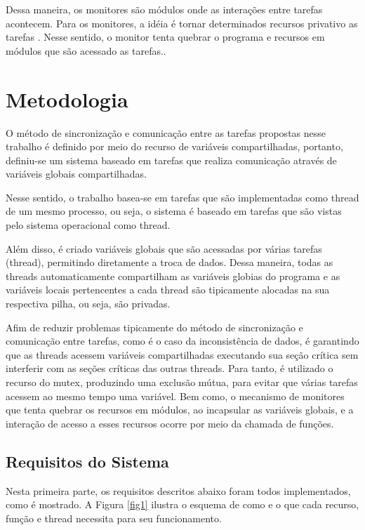 \documentclass[journal]{IEEEtran}
\begin{document}
Dessa maneira, os monitores são módulos onde as interações entre tarefas acontecem. Para os monitores, a idéia é tornar determinados recursos privativo as tarefas \cite{IEEEhowto:romulo}. Nesse sentido, o monitor tenta quebrar o programa e recursos em módulos que são acessado as tarefas.. 

\section{Metodologia}

O método de sincronização e comunicação entre as tarefas propostas nesse trabalho é definido por meio do recurso de variáveis compartilhadas, portanto, definiu-se um sistema baseado em tarefas que realiza comunicação através de variáveis globais compartilhadas.

Nesse sentido, o trabalho basea-se em tarefas que são implementadas como thread de um mesmo processo, ou seja, o sistema é baseado em tarefas que são vistas pelo sistema operacional como thread.

Além disso,  é criado variáveis globais que são acessadas por várias tarefas (thread), permitindo diretamente a troca de dados. Dessa maneira, todas as threads automaticamente compartilham as variáveis globias do programa e as variáveis locais pertencentes a cada thread são tipicamente alocadas na  sua respectiva pilha, ou seja, são privadas. 

Afim de reduzir problemas tipicamente do método de sincronização e comunicação entre tarefas, como é o caso da inconsistência de dados, é garantindo que as threads acessem  variáveis compartilhadas executando sua seção crítica sem interferir com as seções críticas das outras threads. Para tanto, é utilizado o recurso do mutex, produzindo uma exclusão mútua, para evitar que várias tarefas acessem ao mesmo tempo uma variável. Bem como, o mecanismo de monitores que tenta quebrar os recursos em módulos, ao incapsular as variáveis globais, e a interação de acesso a esses recursos ocorre por meio da chamada de funções. 


\subsection{Requisitos do Sistema}

Nesta primeira parte, os requisitos descritos abaixo foram todos implementados, como é mostrado. A Figura \ref{fig1} ilustra o esquema de como e o que cada recurso, função e thread necessita para seu funcionamento.
\end{document}
